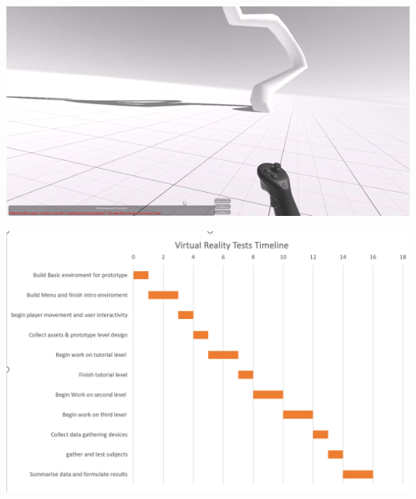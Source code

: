 \includegraphics[width=15cm]{Chapters/Picture3.png}

\includegraphics[width=15cm]{Chapters/Picture4.png}